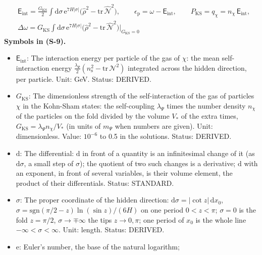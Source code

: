 \documentclass[
  10pt,
]{article}
\providecommand{\tightlist}{%
  \setlength{\itemsep}{0pt}\setlength{\parskip}{0pt}}
\begin{document}
\[
\begin{aligned}
&\mathsf{E}_{\mathrm{int}} = \frac{G_{\mathrm{KS}}}{2}\int\mathrm{d}\sigma\,\mathrm{e}^{7H\lvert\sigma\rvert}\Big(\hat\rho^2 - \mathrm{tr}\,\hat{\mathcal{N}}^2\Big),\qquad
 \epsilon_{\mathrm{p}} = \omega - \mathsf{E}_{\mathrm{int}},\qquad P_{\mathrm{KS}} = q_\chi = n_\chi\,\mathsf{E}_{\mathrm{int}},\\
&\Delta\omega = G_{\mathrm{KS}}\int\mathrm{d}\sigma\,\mathrm{e}^{7H\lvert\sigma\rvert}\Big(\hat\rho^2 - \mathrm{tr}\,\hat{\mathcal{N}}^2\Big)\Big\vert_{G_{\mathrm{KS}} = 0}
\end{aligned} \tag{S-9}
\] \textbf{Symbols in (S-9).}

\begin{itemize}
\tightlist
\item
  \(\mathsf{E}_{\mathrm{int}}\): The interaction energy per particle of
  the gas of \(\chi\): the mean self-interaction energy
  \(\frac{\lambda_\Psi}{2}(n_{\mathrm{s}}^2 - \mathrm{tr}\,\mathcal{N}^2)\)
  integrated across the hidden direction, per particle. Unit: GeV.
  Status: DERIVED.
\item
  \(G_{\mathrm{KS}}\): The dimensionless strength of the
  self-interaction of the gas of particles \(\chi\) in the Kohn-Sham
  states: the self-coupling \(\lambda_\Psi\) times the number density
  \(n_\chi\) of the particles on the fold divided by the volume \(V_*\)
  of the extra times, \(G_{\mathrm{KS}} = \lambda_\Psi n_\chi/V_*\) (in
  units of \(m_\Psi\) when numbers are given). Unit: dimensionless.
  Value: \(10^{-6}\) to 0.5 in the solutions. Status: DERIVED.
\item
  \(\mathrm{d}\): The differential: \(\mathrm{d}\) in front of a
  quantity is an infinitesimal change of it (as \(\mathrm{d}\sigma\), a
  small step of \(\sigma\)); the quotient of two such changes is a
  derivative; \(\mathrm{d}\) with an exponent, in front of several
  variables, is their volume element, the product of their
  differentials. Status: STANDARD.
\item
  \(\sigma\): The proper coordinate of the hidden direction:
  \(\mathrm{d}\sigma = \lvert\cot z\rvert\,\mathrm{d}x_0\),
  \(\sigma = \mathrm{sgn}(\pi/2 - z)\ln(\sin z)/(6H)\) on one period
  \(0 < z < \pi\); \(\sigma = 0\) is the fold \(z = \pi/2\),
  \(\sigma \to \mp\infty\) the tips \(z \to 0, \pi\); one period of
  \(x_0\) is the whole line \(-\infty < \sigma < \infty\). Unit: length.
  Status: DERIVED.
\item
  \(\mathrm{e}\): Euler's number, the base of the natural logarithm;

\end{itemize}
\end{document}
